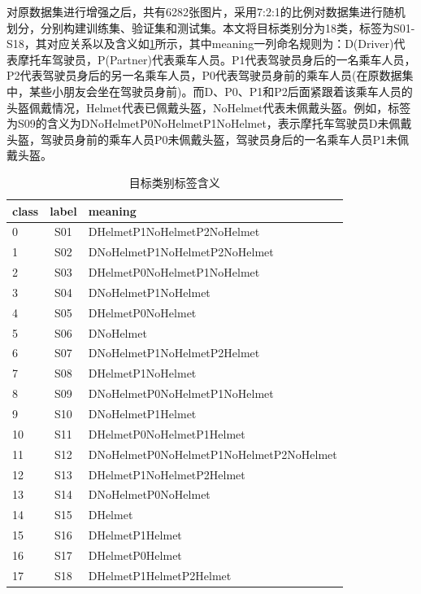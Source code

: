 对原数据集进行增强之后，共有6282张图片，采用7:2:1的比例对数据集进行随机划分，分别构建训练集、验证集和测试集。本文将目标类别分为18类，标签为S01-S18，其对应关系以及含义如\ref{tab:newlabel}所示，其中meaning一列命名规则为：D(Driver)代表摩托车驾驶员，P(Partner)代表乘车人员。P1代表驾驶员身后的一名乘车人员，P2代表驾驶员身后的另一名乘车人员，P0代表驾驶员身前的乘车人员(在原数据集中，某些小朋友会坐在驾驶员身前)。而D、P0、P1和P2后面紧跟着该乘车人员的头盔佩戴情况，Helmet代表已佩戴头盔，NoHelmet代表未佩戴头盔。例如，标签为S09的含义为DNoHelmetP0NoHelmetP1NoHelmet，表示摩托车驾驶员D未佩戴头盔，驾驶员身前的乘车人员P0未佩戴头盔，驾驶员身后的一名乘车人员P1未佩戴头盔。

\begin{table}[htb]
    \centering
    \caption[标签解释]{目标类别标签含义\label{tab:newlabel}}
    \begin{tabular}{lcl}
        \toprule
        \multicolumn{1}{c}{class} & \multicolumn{1}{c}{label} & \multicolumn{1}{l}{meaning} \\
        \midrule
        0 & S01 & DHelmetP1NoHelmetP2NoHelmet \\
        1 & S02 & DNoHelmetP1NoHelmetP2NoHelmet \\
        2 & S03 & DHelmetP0NoHelmetP1NoHelmet \\
        3 & S04 & DNoHelmetP1NoHelmet \\
        4 & S05 & DHelmetP0NoHelmet \\
        5 & S06 & DNoHelmet \\
        6 & S07 & DNoHelmetP1NoHelmetP2Helmet \\
        7 & S08 & DHelmetP1NoHelmet \\
        8 & S09 & DNoHelmetP0NoHelmetP1NoHelmet \\
        9 & S10 & DNoHelmetP1Helmet \\
        10 & S11 &  DHelmetP0NoHelmetP1Helmet \\
        11 & S12 &  DNoHelmetP0NoHelmetP1NoHelmetP2NoHelmet \\
        12 & S13 &  DHelmetP1NoHelmetP2Helmet \\
        13 & S14 &  DNoHelmetP0NoHelmet \\
        14 & S15 &  DHelmet \\
        15 & S16 &  DHelmetP1Helmet \\
        16 & S17 &  DHelmetP0Helmet \\
        17 & S18 &  DHelmetP1HelmetP2Helmet \\
        \bottomrule
    \end{tabular}
\end{table}

